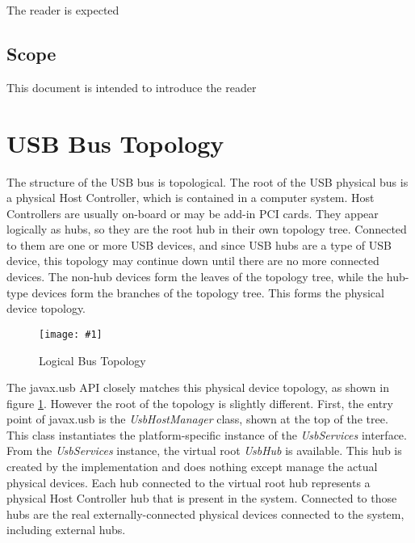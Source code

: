 \documentclass{article}
\newcommand{\myclass}[1]{\emph{#1}}
\newcommand{\myinterface}[1]{\emph{#1}}
\newcommand{\mysectionend}[0]{\vfill\pagebreak[1]}
\newcommand{\myfigure}[3]{\begin{figure}[htbp]\centering\texttt{[image: \#1]}\caption{#2}\label{#3}\end{figure}}
\begin{document}
The reader is expected

\mysubsectionend

\subsection{Scope}

This document is intended to introduce the reader

\mysubsectionend


%

\section{USB Bus Topology}

The structure of the USB bus is topological.  The root
of the USB physical bus is a physical Host Controller, which is contained
in a computer system.  Host Controllers are usually on-board or may be
add-in PCI cards.  They appear logically as hubs, so they are the root hub
in their own topology tree.  Connected to them are one or more USB devices,
and since USB hubs are a type of USB device, this topology may continue
down until there are no more connected devices.  The non-hub devices form
the leaves of the topology tree, while the hub-type devices form the branches
of the topology tree.  This forms the physical device topology.

\myfigure{figs/logical_bus_topology}{Logical Bus Topology}{bus_topology}

The javax.usb API closely matches this physical device topology, as shown in
figure \ref{bus_topology}.  However the root of the topology is slightly different.
First, the entry point of javax.usb is the \myclass{UsbHostManager} class, shown at the
top of the tree.  This class instantiates the platform-specific instance of
the \myinterface{UsbServices} interface.  From the \myinterface{UsbServices} instance, the virtual root
\myinterface{UsbHub} is available.  This hub is created by the implementation and does
nothing except manage the actual physical devices.  Each hub connected to
the virtual root hub represents a physical Host Controller hub that is
present in the system.  Connected to those hubs are the real externally-connected
physical devices connected to the system, including external hubs.

\mysectionend

\end{document}
